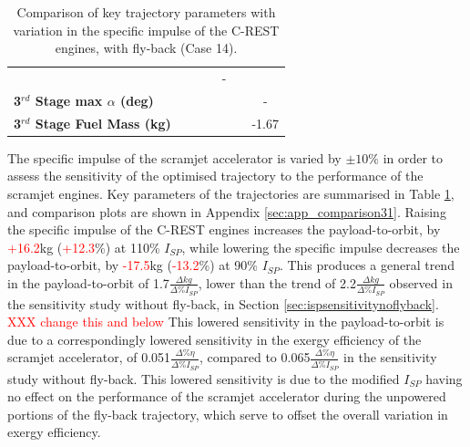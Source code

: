 \begin{table}[ht]
\begin{tabular}{l c c c c c c}
		& \thirdqOverFiveIspStandard
		& \thirdqOverFiveIspOneHundredFive
		& \thirdqOverFiveIspOneHundredTen
		& -
		\\
		\textbf{3$^{rd}$ Stage max $\alpha$ (deg)}
		& \thirdmaxAoAIspNinety
		& \thirdmaxAoAIspNinetyFive
		& \thirdmaxAoAIspStandard
		& \thirdmaxAoAIspOneHundredFive
		& \thirdmaxAoAIspOneHundredTen
		& -
		\\
		\textbf{3$^{rd}$ Stage Fuel Mass (kg)}
		& \thirdmFuelIspNinety
		& \thirdmFuelIspNinetyFive
		& \thirdmFuelIspStandard
		& \thirdmFuelIspOneHundredFive
		& \thirdmFuelIspOneHundredTen
		&-1.67
		\\
		\hline 
	\end{tabular} 
	
	\caption{Comparison of key trajectory parameters with variation in the specific impulse of the C-REST engines, with fly-back (Case 14).}
	\label{tab:comparison31}
\end{table}

The specific impulse of the scramjet accelerator is varied by $\pm10\%$ in order to assess the sensitivity of the optimised trajectory to the performance of the scramjet engines. 
Key parameters of the trajectories are summarised in Table \ref{tab:comparison31}, and comparison plots are shown in Appendix \ref{sec:app_comparison31}.
Raising the specific impulse of the C-REST engines increases the payload-to-orbit, by \textcolor{red}{+16.2}kg (\textcolor{red}{+12.3}\%) at 110\% $I_{SP}$, while lowering the specific impulse decreases the payload-to-orbit, by \textcolor{red}{-17.5}kg (\textcolor{red}{-13.2}\%) at 90\% $I_{SP}$. 
This produces a general trend in the payload-to-orbit of 1.7$\frac{\Delta kg}{\Delta \%I_{SP} }$, lower than the trend of 2.2$\frac{\Delta kg}{\Delta \%I_{SP} }$ observed in the sensitivity study without fly-back, in Section \ref{sec:ispsensitivitynoflyback}. \textcolor{red}{XXX change this and below}
This lowered sensitivity in the payload-to-orbit is due to a correspondingly lowered sensitivity in the exergy efficiency of the scramjet accelerator, of 0.051$\frac{\Delta \% \eta}{\Delta \%I_{SP} }$, compared to 0.065$\frac{\Delta \% \eta}{\Delta \%I_{SP} }$ in the sensitivity study without fly-back. This lowered sensitivity is due to the modified $I_{SP}$ having no effect on the performance of the scramjet accelerator during the unpowered portions of the fly-back trajectory, which serve to offset the overall variation in exergy efficiency. 


